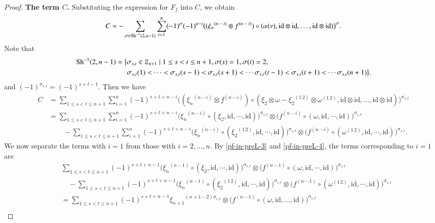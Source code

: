 \documentclass[12pt]{amsart}
\theoremstyle{definition}
\newcommand{\id}{\mathrm{id}}
\newcommand{\ot}{\otimes}
\newcommand{\s}{\mathbb{S}}
\newcommand{\Sh}{{\rm Sh}}
\begin{document}
\begin{proof}
\textbf{The term $C$.}
Substituting the expression for $F_f$ into $C$, we obtain 	
$$
C=-\sum\limits_{\sigma\in\Sh^{-1}(2,n-1)}\sum\limits_{i=1}^n(-1)^{\sigma}(-1)^{n-i}\bigl(({\xi_n}^{(n\,\cdots\,i)}\ot f^{(n\,\cdots\,i)})\circ(\alpha(\nu),\id\otimes\id,\dots,\id\otimes\id)\bigr)^{\sigma}.
$$
	Note that \begin{align*}
		\Sh^{-1}(2,n-1)&=\big\{\sigma_{s,t}\in\s_{n+1}\mid 1\leq s<t\leq n+1,\sigma(s)=1,\sigma(t)=2,\\
		&\;\;\quad\sigma_{s,t}(1)<\cdots<\sigma_{s,t}(s-1)<\sigma_{s,t}(s+1)<\cdots\sigma_{s,t}(t-1)<\sigma_{s,t}(t+1)<\cdots\sigma_{s,t}(n+1)\big\}.
	\end{align*}
	and $(-1)^{\sigma_{s,t}}=(-1)^{s+t-1}$. Then we have
	\begin{align*}
		C&=\sum\limits_{1\leq s<t\leq n+1}\sum\limits_{i=1}^n(-1)^{s+t+n-i}\bigl(({\xi_n}^{(n\,\cdots\,i)}\ot f^{(n\,\cdots\,i)})\circ(\xi_2 \ot \omega-{\xi_2}^{(1\,2)}\ot \omega^{(1\,2)},\id\otimes\id,\dots,\id\otimes\id)\bigr)^{\sigma_{s,t}}\\
		&=\sum\limits_{1\leq s<t\leq n+1}\sum\limits_{i=1}^n(-1)^{s+t+n-i}\bigl( {\xi_n}^{(n\,\cdots\,i)}\circ(\xi_2,\id,\cdots,\id)\bigr)^{\sigma_{s,t}}\ot \bigl(f^{(n\,\cdots\,i)}\circ(\omega,\id,\cdots,\id)\bigr)^{\sigma_{s,t}}\\
		&\quad\quad-\sum\limits_{1\leq s<t\leq n+1}\sum\limits_{i=1}^n(-1)^{s+t+n-i}\bigl( {\xi_n}^{(n\,\cdots\,i)}\circ({\xi_2}^{(1\,2)},\id,\cdots,\id)\bigr)^{\sigma_{s,t}}\ot \bigl(f^{(n\,\cdots\,i)}\circ(\omega^{(1\,2)},\id,\cdots,\id)\bigr)^{\sigma_{s,t}}.
	\end{align*}
	We now separate the terms with $i=1$ from those with $i=2,\ldots,n$. By \eqref{pf-in-preL-3} and \eqref{pf-in-preL-4}, the terms corresponding to $i=1$ are
\begin{align*}
	&\sum\limits_{1\leq s<t\leq n+1}(-1)^{s+t+n-1}\bigl( {\xi_n}^{(n\,\cdots\,1)}\circ(\xi_2,\id,\cdots,\id)\bigr)^{\sigma_{s,t}}\ot \bigl(f^{(n\,\cdots\,1)}\circ(\omega,\id,\cdots,\id)\bigr)^{\sigma_{s,t}}\\
	&\quad-\sum\limits_{1\leq s<t\leq n+1}(-1)^{s+t+n-1}\bigl( {\xi_n}^{(n\,\cdots\,1)}\circ({\xi_2}^{(1\,2)},\id,\cdots,\id)\bigr)^{\sigma_{s,t}}\ot \bigl(f^{(n\,\cdots\,1)}\circ(\omega^{(1\,2)},\id,\cdots,\id)\bigr)^{\sigma_{s,t}}\\
	&=\sum_{1\leq s<t\leq n+1}
	(-1)^{s+t+n-1}
	{\xi_{n+1}}^{(n+1\,\cdots\,2)\sigma_{s,t}}
	\otimes
	\bigl(f^{(n\,\cdots\,1)}
	\circ(\omega,\id,\dots,\id)\bigr)^{\sigma_{s,t}}\\

\end{align*}
\end{proof}
\end{document}
